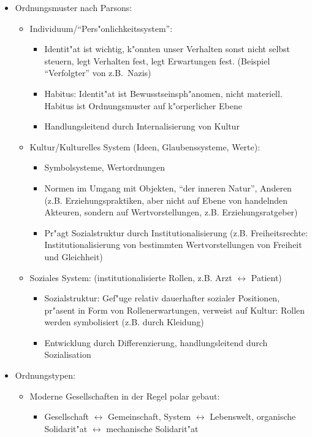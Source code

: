 \begin{itemize}
	\item
		Ordnungsmuster nach Parsons:
		\begin{itemize}
			\item
				Individuum/\enquote{Pers"onlichkeitssystem}:
				\begin{itemize}
					\item
						Identit"at ist wichtig, k"onnten unser Verhalten sonst nicht selbst steuern, legt Verhalten fest, legt Erwartungen fest. (Beispiel \enquote{Verfolgter} von z.B.\ Nazis)
					\item
						Habitus: Identit"at ist Bewusstseinsph"anomen, nicht materiell. Habitus ist Ordnungsmuster auf k"orperlicher Ebene
					\item
						Handlungsleitend durch Internalisierung von Kultur
				\end{itemize}
			\item
				Kultur/Kulturelles System (Ideen, Glaubenssysteme, Werte):
				\begin{itemize}
					\item
						Symbolsysteme, Wertordnungen 
					\item
						Normen im Umgang mit Objekten, \enquote{der inneren Natur}, Anderen (z.B. Erziehungspraktiken, aber nicht auf Ebene von handelnden Akteuren, sondern auf Wertvorstellungen, z.B. Erziehungsratgeber)
					\item
						Pr"agt Sozialstruktur durch Institutionalisierung (z.B. Freiheitsrechte: Institutionalisierung von bestimmten Wertvorstellungen von Freiheit und Gleichheit)
				\end{itemize}
			\item
				Soziales System: (institutionalisierte Rollen, z.B. Arzt $\leftrightarrow$ Patient)
				\begin{itemize}
					\item
						Sozialstruktur: Gef"uge relativ dauerhafter sozialer Positionen, pr"asent in Form von Rollenerwartungen, verweist auf Kultur: Rollen werden symbolisiert (z.B. durch Kleidung)
					\item
						Entwicklung durch Differenzierung, handlungsleitend durch Sozialisation
				\end{itemize}
		\end{itemize}
	\item
		Ordnungstypen:
		\begin{itemize}
			\item
				Moderne Gesellschaften in der Regel polar gebaut:
				\begin{itemize}
					\item
						Gesellschaft $\leftrightarrow$ Gemeinschaft, System $\leftrightarrow$ Lebenswelt, organische Solidarit"at $\leftrightarrow$ mechanische Solidarit"at
				\end{itemize}
		\end{itemize}

\end{itemize}

